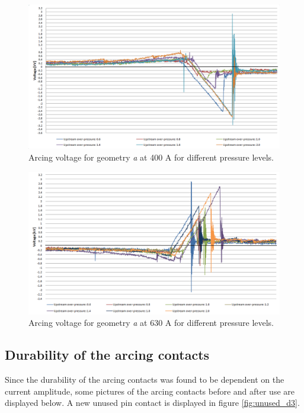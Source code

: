 \documentclass[10pt,a4paper,twoside]{article}
\begin{document}
\begin{figure}[H]
\centering
\includegraphics[scale=0.5]{Bilder/Results/arcingVoltage400Ad4.png}
\caption{Arcing voltage for geometry \textit{a} at 400 A for different pressure levels.} \label{fig:arcingVoltage400A}
\end{figure}

\begin{figure}[H]
\centering
\includegraphics[scale=0.5]{Bilder/Results/arcingVoltage630Ad4.png}
\caption{Arcing voltage for geometry \textit{a} at 630 A for different pressure levels.} \label{fig:arcingVoltage630A}
\end{figure}

\newpage
\subsection{Durability of the arcing contacts} \label{sec:durability}

Since the durability of the arcing contacts was found to be dependent on the current amplitude, some pictures of the arcing contacts before and after use are displayed below. A new unused pin contact is displayed in figure \ref{fig:unused_d3}.
\end{document}
